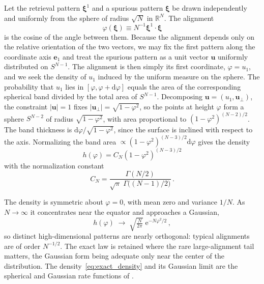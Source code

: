 \documentclass[letterpaper]{article} %
\newcommand{\bxi}{\boldsymbol{\xi}}
\newcommand{\e}{{\mathrm{e}}}
\newcommand{\dd}{{\mathrm{d}}}
\begin{document}
Let the retrieval pattern $\bxi^1$ and a spurious pattern $\bxi$ be drawn independently
and uniformly from the sphere of radius $\sqrt N$ in $\mathbb{R}^N$. The alignment
\begin{equation}
    \varphi(\bxi) \equiv N^{-1} \bxi^1\cdot\bxi
\end{equation}
is the cosine of the angle between them. Because the alignment depends only on the relative 
orientation of the two vectors, we may fix the first pattern along the coordinate axis $\bm e_1$ 
and treat the spurious pattern as a unit vector $\bm u$ uniformly distributed on $S^{N-1}$. 
The alignment is then simply its first coordinate, $\varphi=u_1$, and we seek the density of 
$u_1$ induced by the uniform measure on the sphere.
The probability that $u_1$ lies in $[\varphi,\varphi+\dd\varphi]$ equals the area of the corresponding 
spherical band divided by the total area of $S^{N-1}$. Decomposing $\bm u=(u_1,\bm u_\perp)$, 
the constraint $|\bm u|=1$ fixes $|\bm u_\perp|=\sqrt{1-\varphi^2}$, so the points at height 
$\varphi$ form a sphere $S^{N-2}$ of radius $\sqrt{1-\varphi^2}$, with area proportional to 
$(1-\varphi^2)^{(N-2)/2}$. The band thickness is $\dd\varphi/\sqrt{1-\varphi^2}$, 
since the surface is inclined with respect to the axis. Normalizing the band area
$\propto(1-\varphi^2)^{(N-3)/2}\dd\varphi$ gives the density
\begin{equation}
h(\varphi)=C_N(1-\varphi^2)^{(N-3)/2}
\label{eq:exact_density}
\end{equation}
with the normalization constant
\begin{equation}
C_N=\frac{\Gamma(N/2)}{\sqrt\pi\;\Gamma\!\big((N-1)/2\big)}\,.
\end{equation}

The density is symmetric about $\varphi=0$, with mean zero and variance $1/N$. As $N\to\infty$ it 
concentrates near the equator and approaches a Gaussian,
\begin{equation}
    h(\varphi)\;\longrightarrow \;\sqrt{\tfrac{N}{2\pi}} \; \e^{-N\varphi^2/2}\,,
    \label{eq:gaussian} 
\end{equation}
so distinct high-dimensional patterns are nearly orthogonal: typical alignments are of order $N^{-1/2}$. 
The exact law is retained where the rare large-alignment tail matters, the Gaussian form being 
adequate only near the center of the distribution. 
The density~\eqref{eq:exact_density} and its Gaussian limit are the spherical
and Gaussian rate functions of \citet{lucibello2024exponential}.
\end{document}
